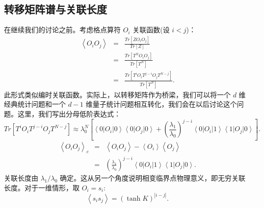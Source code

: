 \documentclass[UTF8]{ctexart}
\begin{document}
\subsection*{转移矩阵谱与关联长度}
\noindent
在继续我们的讨论之前。考虑格点算符 $O_{i}$ 关联函数(设 $i<j$)：
\begin{eqnarray}
\left\langle O_{i}O_{j}\right\rangle  & = & \frac{Tr\left[ZO_{i}O_{j}\right]}{Tr\left[Z\right]}\nonumber \\
 & = & \frac{Tr\left[T^{N}O_{i}O_{j}\right]}{Tr\left[T^{N}\right]}\nonumber \\
 & = & \frac{Tr\left[T^{i}O_{i}T^{j-i}O_{j}T^{N-j}\right]}{Tr\left[T^{N}\right]}.
\end{eqnarray}
此形式类似编时关联函数。实际上，以转移矩阵作为桥梁，我们可以将一个 $d$ 维经典统计问题和一个 $d - 1$ 维量子统计问题相互转化，我们会在以后讨论这个问题。这里，我们写出分母低阶表达式：
\begin{equation}
Tr\left[T^{i}O_{i}T^{j-i}O_{j}T^{N-j}\right]\approx\lambda_{0}^{N}\left[\left\langle 0\right|O_{i}\left|0\right\rangle \left\langle 0\right|O_{j}\left|0\right\rangle +\left(\frac{\lambda_{1}}{\lambda_{0}}\right)^{j-i}\left\langle 0\right|O_{i}\left|1\right\rangle \left\langle 1\right|O_{j}\left|0\right\rangle \right].
\end{equation}
\begin{eqnarray}
\left\langle O_{i}O_{j}\right\rangle _{c} & = & \left\langle O_{i}O_{j}\right\rangle -\left\langle O_{i}\right\rangle \left\langle O_{j}\right\rangle \nonumber \\
 & = & \left(\frac{\lambda_{1}}{\lambda_{0}}\right)^{j-i}\left\langle 0\right|O_{i}\left|1\right\rangle \left\langle 1\right|O_{j}\left|0\right\rangle .
\end{eqnarray}
关联长度由 $\lambda_{1}/\lambda_{0}$ 确定。这从另一个角度说明相变临界点物理意义，即无穷关联长度。对于一维情形，取
$O_{i}=s_{i}$:
\begin{equation}
\left\langle s_{i}s_{j}\right\rangle =\left(\tanh K\right)^{\left|i-j\right|}.
\end{equation}
\end{document}
